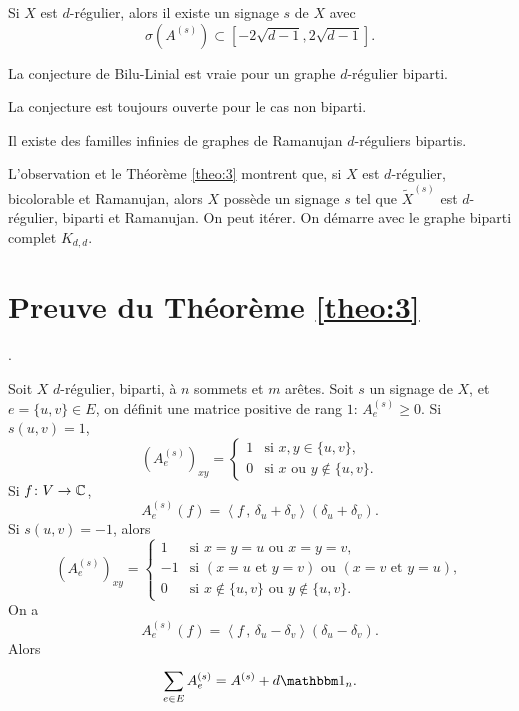 \begin{conj}
  Si $X$ est $d$-régulier, alors il existe un signage $s$ de $X$ avec 
  \[ \sigma(A^{(s)}) \subset \left[-2 \sqrt{d-1}, 2\sqrt{d-1}\right]. \]
\end{conj}

\begin{theo}[MSS]
  \label{theo:3}
  La conjecture de Bilu-Linial est vraie pour un graphe $d$-régulier biparti.
\end{theo}

\begin{rem}
  La conjecture est toujours ouverte pour le cas non biparti.
\end{rem}

\begin{conseq}
  Il existe des familles infinies de graphes de Ramanujan $d$-réguliers bipartis.
\end{conseq}


L'observation et le Théorème \ref{theo:3} montrent que, si $X$ est $d$-régulier, bicolorable et Ramanujan,
alors $X$ possède un signage $s$ tel que $\tilde{X}^{(s)}$ est $d$-régulier, biparti et Ramanujan. On peut
itérer. On démarre avec le graphe biparti complet $K_{d,d}$.

\section{Preuve du Théorème \ref{theo:3}}.


Soit $X$ $d$-régulier, biparti, à $n$ sommets et $m$ arêtes. Soit $s$ un signage de $X$, et $e = \{u, v\} \in
E$, on définit une matrice positive de rang $1$: $A_e^{(s)}\geq 0$. Si $s(u,v) = 1$, 
\[ (A_e^{(s)})_{xy} =
  \begin{cases}
    1 & \text{si } x, y \in \{u,v\},\\
    0 & \text{si } x \text{ ou } y \notin \{u,v\}.
  \end{cases}
\]
Si $f \colon V \to \mathbb{C}$, 
\[ A_e^{(s)}(f) = \left \langle f\, ,\, \delta_u + \delta_v \right \rangle(\delta_u + \delta_v).  \]
Si $s(u,v) = -1$, alors
\[ (A_e^{(s)})_{xy} =
  \begin{cases}
    1 & \text{si } x = y = u \text{ ou } x = y = v,\\
    -1 & \text{si } (x=u \text{ et } y = v) \text{ ou } (x=v \text{ et } y = u),\\
    0 & \text{si } x \notin \{u,v\} \text{ ou } y \notin \{u,v\}.
  \end{cases}
\]
On a
\[ A_e^{(s)}(f) = \left \langle f\, ,\, \delta_u - \delta_v \right \rangle(\delta_u - \delta_v).  \]
Alors 
\[ \sum_{e \in E}^{}A_e^{(s)} = A^{(s)} + d \un_n. \]

